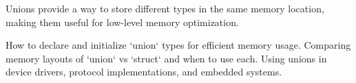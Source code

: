 \begin{comment}
6.5.1.1 Using Structs for Thread Management

6.5.1.2 Lock-Free Data Structures with Atomics

6.5.2 Safer Memory Handling in Struct-Based Programs

6.5.2.1 _Alignas and _Alignof for Memory Alignment

6.5.2.2 _Atomic for Safe Concurrent Struct Usage

6.6 C17 and Beyond – Future Directions
6.6.1 SIMD and Struct-Based Processing

6.6.1.1 Optimizing Structs for Vectorized Instructions

6.6.1.2 Using #include <immintrin.h> for AVX Struct Manipulation

6.6.2 Future of Data Representation in Systems Programming

6.6.2.1 Moving Toward Memory-Safe Alternatives

6.6.2.2 The Rust Influence on Struct Usage
\end{comment}

\begin{NxSBox}[][Unions in C]
	\begin{NxIDBox}
		Unions provide a way to store different types in the same memory location, making them useful for low-level memory optimization.
	\end{NxIDBox}
	\begin{NxIDBoxL}
		 How to declare and initialize `union` types for efficient memory usage.
		 Comparing memory layouts of `union` vs `struct` and when to use each.
		 Using unions in device drivers, protocol implementations, and embedded systems.
	\end{NxIDBoxL}
\end{NxSBox}


